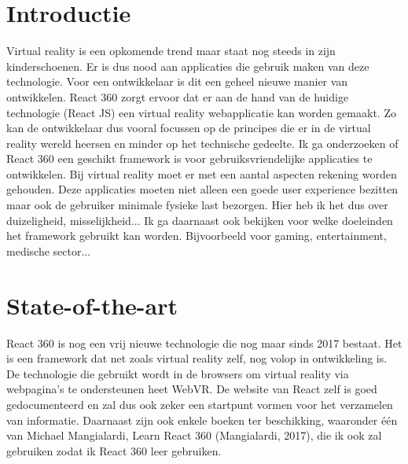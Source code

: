 
\section{Introductie} %
\label{sec:introductie}

Virtual reality is een opkomende trend maar staat nog steeds in zijn kinderschoenen. Er is dus nood aan applicaties die gebruik maken van deze technologie. Voor een ontwikkelaar is dit een geheel nieuwe manier van ontwikkelen. React 360 zorgt ervoor dat er aan de hand van de huidige technologie (React JS) een virtual reality webapplicatie kan worden gemaakt. Zo kan de ontwikkelaar dus vooral focussen op de principes die er in de virtual reality wereld heersen en minder op het technische gedeelte. Ik ga onderzoeken of React 360 een geschikt framework is voor gebruiksvriendelijke applicaties te ontwikkelen. Bij virtual reality moet er met een aantal aspecten rekening worden gehouden. Deze applicaties moeten niet alleen een goede user experience bezitten maar ook de gebruiker minimale fysieke last bezorgen. Hier heb ik het dus over duizeligheid, misselijkheid... Ik ga daarnaast ook bekijken voor welke doeleinden het framework gebruikt kan worden. Bijvoorbeeld voor gaming, entertainment, medische sector...


\section{State-of-the-art}
\label{sec:state-of-the-art}

React 360 is nog een vrij nieuwe technologie die nog maar sinds 2017 bestaat. Het is een framework dat net zoals virtual reality zelf, nog volop in ontwikkeling is. De technologie die gebruikt wordt in de browsers om virtual reality via webpagina's te ondersteunen heet WebVR. De website van React zelf is goed gedocumenteerd en zal dus ook zeker een startpunt vormen voor het verzamelen van informatie. Daarnaast zijn ook enkele boeken ter beschikking, waaronder één van Michael Mangialardi, Learn React 360 (Mangialardi, 2017), die ik ook zal gebruiken zodat ik React 360 leer gebruiken.

